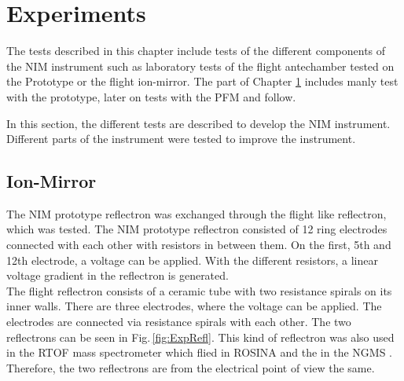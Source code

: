 \section{Experiments} \label{sec:Exp}
	The tests described in this chapter include tests of the different components of the NIM instrument such as laboratory tests of the flight antechamber tested on the Prototype or the flight ion-mirror. The part of Chapter \ref{sec:Exp} includes manly test with the prototype, later on tests with the PFM and follow.


%


	In this section, the different tests are described to develop the NIM instrument. Different parts of the instrument were tested to improve the instrument.
	\subsection{Ion-Mirror}
	
	The NIM prototype reflectron was exchanged through the flight like reflectron, which was tested. The NIM prototype reflectron consisted of 12 ring electrodes connected with each other with resistors in between them. On the first, 5th and 12th electrode, a voltage can be applied. With the different resistors, a linear voltage gradient in the reflectron is generated.\\ %
	The flight reflectron consists of a ceramic tube with two resistance spirals on its inner walls. There are three electrodes, where the voltage can be applied. The electrodes are connected via resistance spirals with each other. The two reflectrons can be seen in Fig.\,\ref{fig:ExpRefl}. This kind of reflectron was also used in the RTOF mass spectrometer which flied in ROSINA \cite{Diss_Scherer} and the in the NGMS \cite{Diss_Hofer}. \\ %
	Therefore, the two reflectrons are from the electrical point of view the same.\\ %
	
